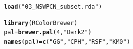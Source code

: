 \documentclass{article}\usepackage[]{graphicx}\usepackage[]{color}
\makeatletter
\newcommand{\hlnum}[1]{\textcolor[rgb]{0.686,0.059,0.569}{#1}}%
\newcommand{\hlstr}[1]{\textcolor[rgb]{0.192,0.494,0.8}{#1}}%
\newcommand{\hlstd}[1]{\textcolor[rgb]{0.345,0.345,0.345}{#1}}%
\newcommand{\hlkwb}[1]{\textcolor[rgb]{0.69,0.353,0.396}{#1}}%
\newcommand{\hlkwd}[1]{\textcolor[rgb]{0.737,0.353,0.396}{\textbf{#1}}}%
\newenvironment{kframe}{%
 \def\at@end@of@kframe{}%
 \ifinner\ifhmode%
  \def\at@end@of@kframe{\end{minipage}}%
  \begin{minipage}{\columnwidth}%
 \fi\fi%
 \def\FrameCommand##1{\hskip\@totalleftmargin \hskip-\fboxsep
 \colorbox{shadecolor}{##1}\hskip-\fboxsep
     \hskip-\linewidth \hskip-\@totalleftmargin \hskip\columnwidth}%
 \MakeFramed {\advance\hsize-\width
   \@totalleftmargin\z@ \linewidth\hsize
   \@setminipage}}%
 {\par\unskip\endMakeFramed%
 \at@end@of@kframe}
\newenvironment{knitrout}{}{} %
\makeatother
\begin{document}
\begin{knitrout}
\begin{kframe}
{\ttfamily\noindent\itshape\color{messagecolor}{\#\# Loading required package: pec\\\#\# Loading required package: mvtnorm\\\#\# Loading required package: timereg}}\begin{alltt}
\hlkwd{load}\hlstd{(}\hlstr{"03_NSWPCN_subset.rda"}\hlstd{)}

\hlkwd{library}\hlstd{(RColorBrewer)}
\hlstd{pal} \hlkwb{=} \hlkwd{brewer.pal}\hlstd{(}\hlnum{4}\hlstd{,} \hlstr{"Dark2"}\hlstd{)}
\hlkwd{names}\hlstd{(pal)} \hlkwb{=} \hlkwd{c}\hlstd{(}\hlstr{"GG"}\hlstd{,} \hlstr{"CPH"}\hlstd{,} \hlstr{"RSF"}\hlstd{,} \hlstr{"KM0"}\hlstd{)}
\end{alltt}
\end{kframe}
\end{knitrout}


\end{document}
